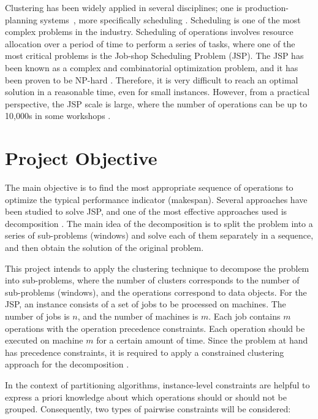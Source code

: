 \documentclass{article}
\newcommand{\comment}[1]{\todo[inline]{#1}}
\begin{document}
Clustering has been widely applied in several disciplines; one is production-planning systems~\cite{nananukul2013clustering,koskosidis1992clustering}, more specifically scheduling \cite{yashar2013multi,tong2016research}. 
\comment{Are there any citations for the claim above?}
Scheduling is one of the most complex problems in the industry. Scheduling of operations involves resource allocation over a period of time to perform a series of tasks, where one of the most critical problems is the Job-shop Scheduling Problem (JSP). The JSP has been known as a complex and combinatorial optimization problem, and it has been proven to be NP-hard \cite{baker1974introduction,lenstra1979computational}. Therefore, it is very difficult to reach an optimal solution in a reasonable time, even for small instances. However, from a practical perspective, the JSP scale is large, where the number of operations can be up to 10,000s in some workshops \cite{zhang2010hybrid}.

\section{Project Objective}
The main objective is to find the most appropriate sequence of operations to optimize the typical performance indicator (makespan). Several approaches have been studied to solve JSP, and one of the most effective approaches used is decomposition \cite{zhang2010hybrid,zhai2014decomposition}. The main idea of the decomposition is to split the problem into a series of sub-problems (windows) and solve each of them separately in a sequence, and then obtain the solution of the original problem.

This project intends to apply the clustering technique to decompose the problem into sub-problems, where the number of clusters corresponds to the number of sub-problems (windows), and the operations correspond to data objects. For the JSP, an instance consists of a set of jobs to be processed on machines. The number of jobs is $n$, and the number of machines is $m$. Each job contains $m$ operations with the operation precedence constraints. Each operation should be executed on machine $m$ for a certain amount of time. Since the problem at hand has precedence constraints, it is required to apply a constrained clustering approach for the decomposition \cite{wagstaff2001constrained}.

In the context of partitioning algorithms, instance-level constraints are helpful to express a priori knowledge about which operations should or should not be grouped. Consequently, two types of pairwise constraints will be considered:
\end{document}
